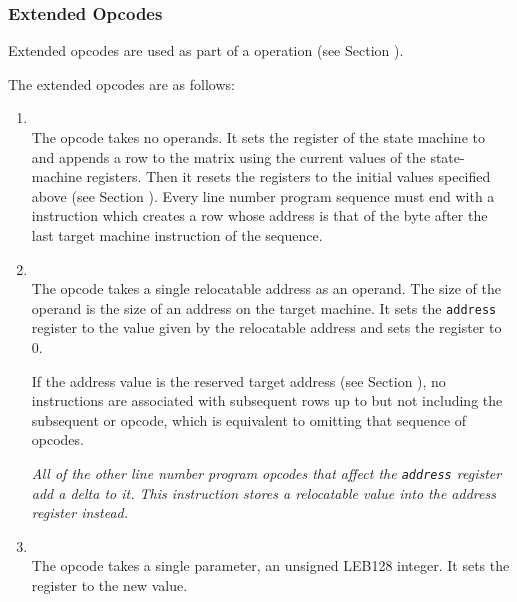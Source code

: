 \subsubsection{Extended Opcodes}
\label{chap:extendedopcodes}
\bb
Extended opcodes are used as part of a \DWLNSextendedop{} operation
(see Section ).
\eb

The extended opcodes are as follows:

\begin{enumerate}[1. ]

\item \textbf{\DWLNEendsequenceTARG} \\
The \DWLNEendsequenceNAME{} opcode takes no operands. It sets the
register of the state machine to  and
appends a row to the matrix using the current values of the
state-machine registers. Then it resets the registers to the
initial values specified above 
(see Section ). 
Every line
number program sequence must end with a \DWLNEendsequence{}
instruction which creates a row whose address is that of the
byte after the last target machine instruction of the sequence.

\item \textbf{\DWLNEsetaddressTARG} \\
The \DWLNEsetaddressNAME{} opcode takes a single relocatable
address as an operand. The size of the operand is the size
of an address on the target machine. It sets the \texttt{address}
register to the value given by the relocatable address and
sets the  register to 0.

\bb
If the address value is the reserved target address (see Section 
),
no instructions are associated with subsequent rows up to
but not including the subsequent \DWLNEsetaddress{} or
\DWLNEendsequence{} opcode, which is equivalent to omitting that sequence
of opcodes.
\eb

\textit{All of the other line number program opcodes that
affect the \texttt{address} register add a delta to it. This instruction
stores a relocatable value into 
\bb
the address register
\eb
instead.}

\item \textbf{\DWLNEsetdiscriminatorTARG} \\
The \DWLNEsetdiscriminatorNAME{}
opcode takes a single
parameter, an unsigned LEB128 
integer. It sets the
 register to the new value.


\end{enumerate}

